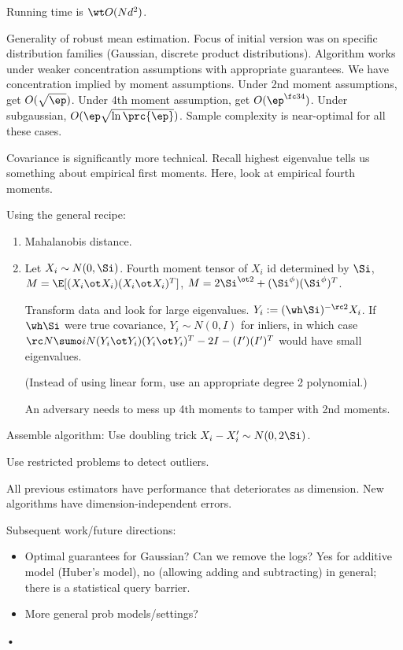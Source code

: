 Running time is $\wt O(Nd^2)$.

Generality of robust mean estimation. Focus of initial version was on specific distribution families (Gaussian, discrete product distributions).  Algorithm works under weaker concentration assumptions with appropriate guarantees. We have concentration implied by moment assumptions. Under 2nd moment assumptions, get $O(\sqrt \ep)$. Under 4th moment assumption, get $O(\ep^{\fc 34})$. Under subgaussian, $O(\ep \sqrt{\ln \prc{\ep}})$. Sample complexity is near-optimal for all these cases. 

Covariance is significantly more technical.
Recall highest eigenvalue tells us something about empirical first moments.
Here, look at empirical fourth moments. 

Using the general recipe:
\begin{enumerate}
\item
Mahalanobis distance. %
\item
Let $X_i\sim N(0,\Si)$. Fourth moment tensor of $X_i$ id determined by $\Si$, $M=\E[(X_i\ot X_i)(X_i\ot X_i)^T]$, $M=2\Si^{\ot 2} + (\Si^\phi)(\Si^\phi)^T$.

Transform data and look for large eigenvalues. $Y_i:= (\wh \Si )^{-\rc 2} X_i$. If $\wh \Si$ were true covariance, $Y_i\sim N(0,I)$ for inliers, in which case $\rc N\sumo iN (Y_i\ot Y_i)(Y_i\ot Y_i)^T - 2I - (I')(I')^T$ would have small eigenvalues. 

(Instead of using linear form, use an appropriate degree 2 polynomial.) 

An adversary needs to mess up 4th moments to tamper with 2nd moments.
\end{enumerate}

Assemble algorithm: Use doubling trick $X_i-X_i'\sim N(0,2\Si)$.

Use restricted problems to detect outliers. 

All previous estimators have performance that deteriorates as dimension. 
New algorithms have dimension-independent errors.

Subsequent work/future directions:
\begin{itemize}
\item
Optimal guarantees for Gaussian? 
Can we remove the logs? Yes for additive model (Huber's model), no (allowing adding and subtracting) in general; there is a statistical query barrier. 
\item
More general prob models/settings?
\end{itemize}•

